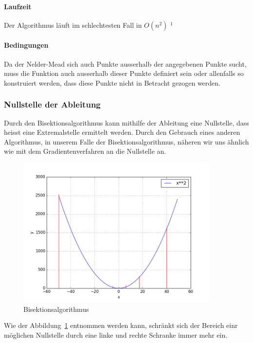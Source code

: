 \documentclass[10pt]{article}         %
\begin{document}
\paragraph{Laufzeit}
Der Algorithmus läuft im schlechtesten Fall in $O(n^2)$ $^1$

\paragraph{Bedingungen}
Da der Nelder-Mead sich auch Punkte ausserhalb der angegebenen Punkte sucht, muss die Funktion auch ausserhalb dieser Punkte definiert sein oder allenfalls so konstruiert werden, dass diese Punkte nicht in Betracht gezogen werden.

\subsubsection{Nullstelle der Ableitung}
Durch den Bisektionsalgorithmus kann mithilfe der Ableitung eine Nullstelle, dass heisst eine Extremalstelle ermittelt werden. Durch den Gebrauch eines anderen Algorithmus, in unserem Falle der Bisektionsalgorithmus, näheren wir uns ähnlich wie mit dem Gradientenverfahren an die Nullstelle an. 

\begin{figure}[!ht]
    \centering
    \includegraphics[width=0.9\textwidth]{bisektion}
    \caption{Bisektionsalgorithmus}\label{bisektion}
\end{figure}

Wie der Abbildung~\ref{bisektion} entnommen werden kann, schränkt sich der Bereich einr möglichen Nullstelle durch eine linke und rechte Schranke immer mehr ein.
\end{document}
